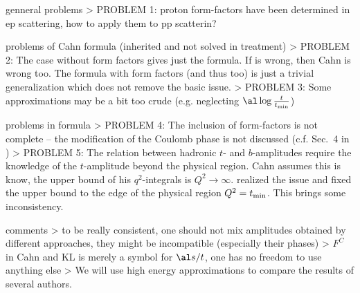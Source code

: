 \> genneral problems
\>> PROBLEM 1: proton form-factors have been determined in ep scattering, how to apply them to pp scatterin?

\> problems of Cahn formula (inherited and not solved in \KL{} treatment)
\>> PROBLEM 2: The case without form factors gives just the \WY{} formula. If \WY{} is wrong, then Cahn is wrong too. The formula with form factors (and thus \KL too) is just a trivial generalization which does not remove the basic issue.
\>> PROBLEM 3: Some approximations may be a bit too crude (e.g. neglecting $\al \log {t\over t_{\rm min}}$)

\> problems in \KL{} formula
\>> PROBLEM 4: The inclusion of form-factors is not complete -- the modification of the Coulomb phase is not discussed (c.f. Sec.~4 in )
\>> PROBLEM 5: The relation between hadronic $t$- and $b$-amplitudes require the knowledge of the $t$-amplitude beyond the physical region. Cahn assumes this is know, the upper bound of his $q^2$-integrals is $Q^2\to\infty$. \KL{} realized the issue and fixed the upper bound to the edge of the physical region $Q^2 = t_{\rm min}$. This brings some inconsistency.

\> comments
\>> to be really consistent, one should not mix amplitudes obtained by different approaches, they might be incompatible (especially their phases) 
\>> $F^C$ in Cahn and KL is merely a symbol for $\al s/t$, one has no freedom to use anything else
\>> We will use high energy approximations to compare the results of several authors.

\vskip1cm

\iffalse
Out of the four fundamental forces, only two are important for forward scattering of protons, namely strong and electromagnetic. The gravitational force is too weak and the weak force has a negligible contribution only (\TODO{suppressed by the mass of its bosons}).

Bethe derived \bref{bethe58}
\eqref{F^{C+H}(t) = F^C(t) e^{i \al \Ph(t)} + F^H(t)}{el FCH decomp}
with the Coulomb-hadronic phase $\Phi$
\eqref{\Phi_{\rm Bethe}(t) = 2 \log {1.06\over a\sqrt{t}}}{el phase bethe}
\TODO{explain}
\fi

